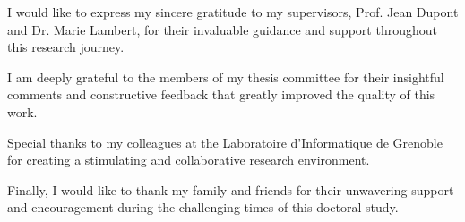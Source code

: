 I would like to express my sincere gratitude to my supervisors, Prof. Jean Dupont and Dr. Marie Lambert, for their invaluable guidance and support throughout this research journey.

I am deeply grateful to the members of my thesis committee for their insightful comments and constructive feedback that greatly improved the quality of this work.

Special thanks to my colleagues at the Laboratoire d'Informatique de Grenoble for creating a stimulating and collaborative research environment.

Finally, I would like to thank my family and friends for their unwavering support and encouragement during the challenging times of this doctoral study.